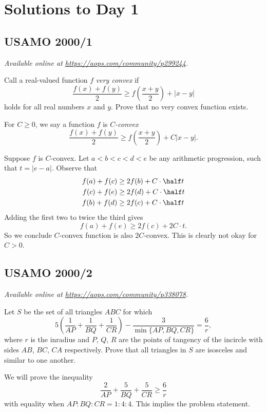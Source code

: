 \documentclass[11pt]{scrartcl}
\begin{document}
\section{Solutions to Day 1}
\subsection{USAMO 2000/1}
\textsl{Available online at \url{https://aops.com/community/p299244}.}
\begin{mdframed}[style=mdpurplebox,frametitle={Problem statement}]
Call a real-valued function $f$ \emph{very convex} if
\[ \frac{f(x)+f(y)}{2}
  \ge f\left( \frac{x+y}{2} \right) + \left\lvert x-y \right\rvert  \]
holds for all real numbers $x$ and $y$.
Prove that no very convex function exists.
\end{mdframed}
For $C \ge 0$, we say a function $f$ is \emph{$C$-convex}
\[ \frac{f(x)+f(y)}{2}
  \ge f\left( \frac{x+y}{2} \right) + C\left\lvert x-y \right\rvert. \]

Suppose $f$ is $C$-convex.
Let $a < b < c < d < e$ be any arithmetic progression,
such that $t = |e-a|$.
Observe that
\begin{align*}
  f(a) + f(c) &\ge 2f(b) + C \cdot \half t \\
  f(c) + f(e) &\ge 2f(d) + C \cdot \half t \\
  f(b) + f(d) &\ge 2f(c) + C \cdot \half t
\end{align*}
Adding the first two to twice the third gives
\[ f(a) + f(e) \ge 2f(c) + 2C \cdot t. \]
So we conclude $C$-convex function is also $2C$-convex.
This is clearly not okay for $C > 0$.
\pagebreak

\subsection{USAMO 2000/2}
\textsl{Available online at \url{https://aops.com/community/p338078}.}
\begin{mdframed}[style=mdpurplebox,frametitle={Problem statement}]
Let $S$ be the set of all triangles $ABC$ for which
\[ 5 \left( \frac{1}{AP} + \frac{1}{BQ} + \frac{1}{CR} \right)
  - \frac{3}{\min\{ AP, BQ, CR \}} = \frac{6}{r}, \]
where $r$ is the inradius and $P$, $Q$, $R$ are the points of tangency
of the incircle with sides $AB$, $BC$, $CA$ respectively.
Prove that all triangles in $S$ are isosceles and similar to one another.
\end{mdframed}
We will prove the inequality
\[ \frac{2}{AP} + \frac{5}{BQ} + \frac{5}{CR} \ge \frac 6r \]
with equality when $AP : BQ : CR = 1 : 4 : 4$.
This implies the problem statement.
\end{document}
